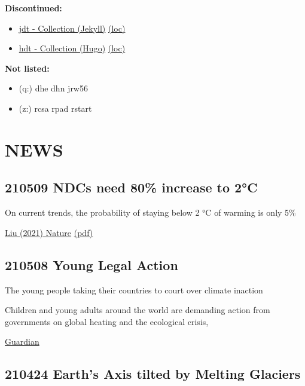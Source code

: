 \documentclass[
]{book}
\providecommand{\tightlist}{%
  \setlength{\itemsep}{0pt}\setlength{\parskip}{0pt}}
\begin{document}
\textbf{Discontinued:}

\begin{itemize}
\tightlist
\item
  \href{https://dyrehaugen.github.io/jdt}{jdt - Collection (Jekyll)} \href{http://localhost/jdt}{(loc)}
\item
  \href{https://dyrehaugen.github.io/hdt}{hdt - Collection (Hugo)} \href{http://localhost/hdt}{(loc)}
\end{itemize}

\textbf{Not listed:}

\begin{itemize}
\tightlist
\item
  (q:) dhe dhn jrw56
\item
  (z:) rcsa rpad rstart
\end{itemize}

\hypertarget{news}{%
\chapter{NEWS}\label{news}}

\hypertarget{ndcs-need-80-increase-to-2c}{%
\section{210509 NDCs need 80\% increase to 2°C}\label{ndcs-need-80-increase-to-2c}}

On current trends, the probability of staying
below 2 °C of warming is only 5\%

\href{https://www.nature.com/articles/s43247-021-00097-8}{Liu (2021) Nature}
\href{pdf/Liu_2021_NDC_80pct_2C.pdf}{(pdf)}

\hypertarget{young-legal-action}{%
\section{210508 Young Legal Action}\label{young-legal-action}}

The young people taking their countries to court over climate inaction

Children and young adults around the world are demanding action from governments on global heating and the ecological crisis,

\href{https://www.theguardian.com/environment/2021/may/07/the-young-people-taking-their-countries-to-court-over-climate-inaction}{Guardian}

\hypertarget{earths-axis-tilted-by-melting-glaciers}{%
\section{210424 Earth's Axis tilted by Melting Glaciers}\label{earths-axis-tilted-by-melting-glaciers}}
\end{document}
